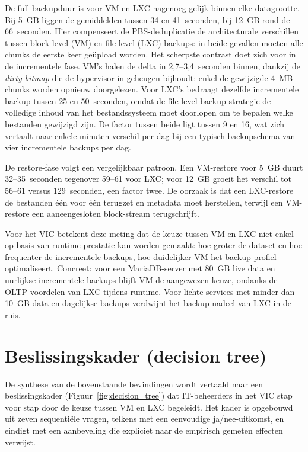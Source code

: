 De full-backupduur is voor VM en LXC nagenoeg gelijk binnen elke datagrootte. Bij 5~GB liggen de gemiddelden tussen 34 en 41~seconden, bij 12~GB rond de 66~seconden. Hier compenseert de PBS-deduplicatie de architecturale verschillen tussen block-level (VM) en file-level (LXC) backups: in beide gevallen moeten alle chunks de eerste keer geüpload worden. Het scherpste contrast doet zich voor in de incrementele fase. VM's halen de delta in 2,7--3,4~seconden binnen, dankzij de \textit{dirty bitmap} die de hypervisor in geheugen bijhoudt: enkel de gewijzigde 4~MB-chunks worden opnieuw doorgelezen. Voor LXC's bedraagt dezelfde incrementele backup tussen 25 en 50~seconden, omdat de file-level backup-strategie de volledige inhoud van het bestandssysteem moet doorlopen om te bepalen welke bestanden gewijzigd zijn. De factor tussen beide ligt tussen 9 en 16, wat zich vertaalt naar enkele minuten verschil per dag bij een typisch backupschema van vier incrementele backups per dag.

De restore-fase volgt een vergelijkbaar patroon. Een VM-restore voor 5~GB duurt 32--35~seconden tegenover 59--61 voor LXC; voor 12~GB groeit het verschil tot 56--61 versus 129~seconden, een factor twee. De oorzaak is dat een LXC-restore de bestanden één voor één terugzet en metadata moet herstellen, terwijl een VM-restore een aaneengesloten block-stream terugschrijft.

Voor het VIC betekent deze meting dat de keuze tussen VM en LXC niet enkel op basis van runtime-prestatie kan worden gemaakt: hoe groter de dataset en hoe frequenter de incrementele backups, hoe duidelijker VM het backup-profiel optimaliseert. Concreet: voor een MariaDB-server met 80~GB live data en uurlijkse incrementele backups blijft VM de aangewezen keuze, ondanks de OLTP-voordelen van LXC tijdens runtime. Voor lichte services met minder dan 10~GB data en dagelijkse backups verdwijnt het backup-nadeel van LXC in de ruis.

\section{Beslissingskader (decision tree)}
\label{sec:beslissingskader}

De synthese van de bovenstaande bevindingen wordt vertaald naar een beslissingskader (Figuur~\ref{fig:decision_tree}) dat IT-beheerders in het VIC stap voor stap door de keuze tussen VM en LXC begeleidt. Het kader is opgebouwd uit zeven sequentiële vragen, telkens met een eenvoudige ja/nee-uitkomst, en eindigt met een aanbeveling die expliciet naar de empirisch gemeten effecten verwijst.


